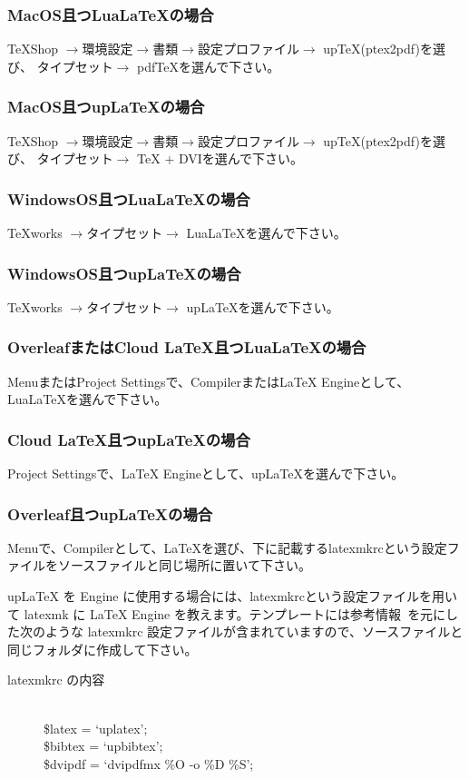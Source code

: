 \documentclass{PASJ2024}
\begin{document}
\subsubsection{MacOS且つLuaLaTeXの場合}
TeXShop $\rightarrow$環境設定$\rightarrow$書類$\rightarrow$設定プロファイル$\rightarrow$ upTeX(ptex2pdf)を選び、
タイプセット$\rightarrow$ pdfTeXを選んで下さい。
\subsubsection{MacOS且つupLaTeXの場合}
TeXShop $\rightarrow$環境設定$\rightarrow$書類$\rightarrow$設定プロファイル$\rightarrow$ upTeX(ptex2pdf)を選び、
タイプセット$\rightarrow$ TeX + DVIを選んで下さい。
\subsubsection{WindowsOS且つLuaLaTeXの場合}
TeXworks $\rightarrow$タイプセット$\rightarrow$ LuaLaTeXを選んで下さい。
\subsubsection{WindowsOS且つupLaTeXの場合}
TeXworks $\rightarrow$タイプセット$\rightarrow$ upLaTeXを選んで下さい。
%
\subsubsection{OverleafまたはCloud LaTeX且つLuaLaTeXの場合}
MenuまたはProject Settingsで、CompilerまたはLaTeX Engineとして、LuaLaTeXを選んで下さい。\\
%
\subsubsection{Cloud LaTeX且つupLaTeXの場合}
Project Settingsで、LaTeX Engineとして、upLaTeXを選んで下さい。
\subsubsection{Overleaf且つupLaTeXの場合}
Menuで、Compilerとして、LaTeXを選び、下に記載するlatexmkrcという設定ファイルをソースファイルと同じ場所に置いて下さい。

{up\LaTeX} を Engine に使用する場合には、latexmkrcという設定ファイルを用いて latexmk に LaTeX Engine を教えます。テンプレートには参考情報~\cite{Overleaf-uptex}を元にした次のような latexmkrc 設定ファイルが含まれていますので、ソースファイルと同じフォルダに作成して下さい。
\begin{description}
\item[latexmkrc の内容]{
\ \\
\$latex = `uplatex';\\
\$bibtex = `upbibtex';\\
\$dvipdf = `dvipdfmx \%O -o \%D \%S';\\
}
\end{description}
\end{document}
